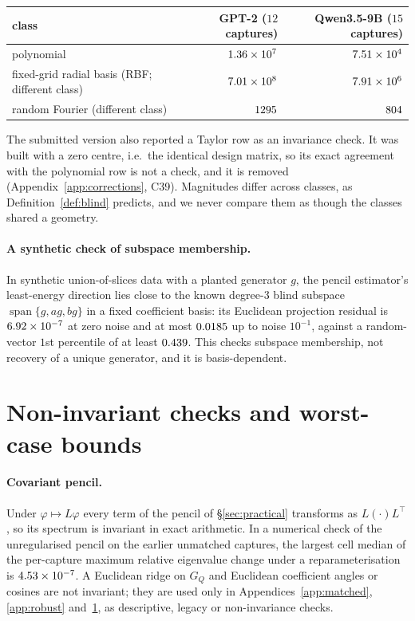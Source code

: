 \begin{center}\small
\begin{tabular}{lrr}
\toprule
class & GPT-2 ($12$ captures) & Qwen3.5-9B ($15$ captures) \\
\midrule
polynomial & $1.36\times10^{7}$ & $7.51\times10^{4}$ \\
fixed-grid radial basis (RBF; different class) & $7.01\times10^{8}$ & $7.91\times10^{6}$ \\
random Fourier (different class) & $1295$ & $804$ \\
\bottomrule
\end{tabular}
\end{center}

\noindent The submitted version also reported a Taylor row as an invariance check. It was built with a zero centre,
i.e.\ the identical design matrix, so its exact agreement with the polynomial row is not a check, and it is removed
(Appendix~\ref{app:corrections}, C39). Magnitudes differ across classes, as Definition~\ref{def:blind} predicts, and
we never compare them as though the classes shared a geometry.

\paragraph{A synthetic check of subspace membership.} In synthetic union-of-slices data with a planted generator $g$,
the pencil estimator's least-energy direction lies close to the known degree-3 blind subspace
$\operatorname{span}\{g,ag,bg\}$ in a fixed coefficient basis: its Euclidean projection residual is $6.92\times10^{-7}$ at zero noise and at most
$0.0185$ up to noise $10^{-1}$, against a random-vector $1$st percentile of at least $0.439$. This checks
subspace membership, not recovery of a unique generator, and it is basis-dependent.

\section{Non-invariant checks and worst-case bounds}
\label{app:noninvariant}

\paragraph{Covariant pencil.} Under $\varphi\mapsto L\varphi$ every term of the pencil of \S\ref{sec:practical} transforms as
$L(\cdot)L^\top$, so its spectrum is invariant in exact arithmetic. In a numerical check of the unregularised pencil on
the earlier unmatched captures, the largest cell median of the per-capture maximum relative eigenvalue change under a
reparameterisation is $4.53\times10^{-7}$. A Euclidean ridge on $G_Q$ and Euclidean coefficient angles or cosines are
not invariant; they are used only in Appendices~\ref{app:matched}, \ref{app:robust} and~\ref{app:noninvariant}, as
descriptive, legacy or non-invariance checks.

